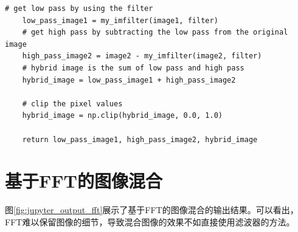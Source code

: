 \begin{lstlisting}[style=Python]
    # get low pass by using the filter
    low_pass_image1 = my_imfilter(image1, filter)
    # get high pass by subtracting the low pass from the original image
    high_pass_image2 = image2 - my_imfilter(image2, filter)
    # hybrid image is the sum of low pass and high pass
    hybrid_image = low_pass_image1 + high_pass_image2
    
    # clip the pixel values
    hybrid_image = np.clip(hybrid_image, 0.0, 1.0)
    
    return low_pass_image1, high_pass_image2, hybrid_image

\end{lstlisting}

\newpage

\section{基于FFT的图像混合}

图\ref{fig:jupyter_output_fft}展示了基于FFT的图像混合的输出结果。可以看出，FFT难以保留图像的细节，导致混合图像的效果不如直接使用滤波器的方法。

